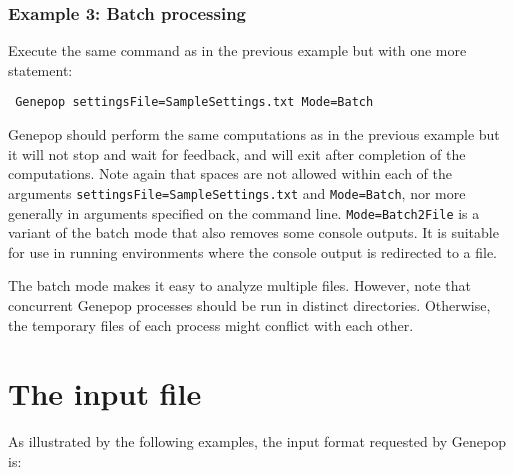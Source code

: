 \documentclass[
  12pt,
]{book}
\begin{document}
\hypertarget{example-3-batch-processing}{%
\subsection{Example 3: Batch processing}\label{example-3-batch-processing}}

Execute the same command as in the previous example but with one more statement:

\begin{verbatim}
 Genepop settingsFile=SampleSettings.txt Mode=Batch
\end{verbatim}

 Genepop should perform the same computations as in the previous example but it will not stop and wait for feedback, and will exit after completion of the computations. Note again that spaces are not allowed within each of the arguments \texttt{settingsFile=SampleSettings.txt} and \texttt{Mode=Batch}, nor more generally in arguments specified on the command line. \texttt{Mode=Batch2File} is a variant of the batch mode that also removes some console outputs. It is suitable for use in running environments where the console output is redirected to a file.

The batch mode makes it easy to analyze multiple files. However, note that concurrent Genepop processes should be run in distinct directories. Otherwise, the temporary files of each process might conflict with each other.

\hypertarget{the-input-file}{%
\chapter{The input file}\label{the-input-file}}

 As illustrated by the following examples, the input format requested by
Genepop is:
\end{document}
